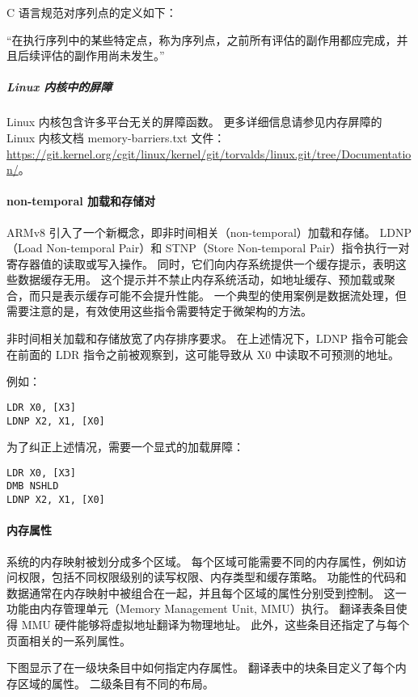 C 语言规范对序列点的定义如下：

“在执行序列中的某些特定点，称为序列点，之前所有评估的副作用都应完成，并且后续评估的副作用尚未发生。”

\subparagraph*{Linux 内核中的屏障}

Linux 内核包含许多平台无关的屏障函数。
更多详细信息请参见内存屏障的 Linux 内核文档 memory-barriers.txt 文件：
\url{https://git.kernel.org/cgit/linux/kernel/git/torvalds/linux.git/tree/Documentation/}。

\paragraph{non-temporal 加载和存储对}

ARMv8 引入了一个新概念，即非时间相关（non-temporal）加载和存储。
LDNP（Load Non-temporal Pair）和 STNP（Store Non-temporal Pair）指令执行一对寄存器值的读取或写入操作。
同时，它们向内存系统提供一个缓存提示，表明这些数据缓存无用。
这个提示并不禁止内存系统活动，如地址缓存、预加载或聚合，而只是表示缓存可能不会提升性能。
一个典型的使用案例是数据流处理，但需要注意的是，有效使用这些指令需要特定于微架构的方法。

非时间相关加载和存储放宽了内存排序要求。
在上述情况下，LDNP 指令可能会在前面的 LDR 指令之前被观察到，这可能导致从 X0 中读取不可预测的地址。

例如：

\begin{lstlisting}
LDR X0, [X3]
LDNP X2, X1, [X0]
\end{lstlisting}

为了纠正上述情况，需要一个显式的加载屏障：

\begin{lstlisting}
LDR X0, [X3]
DMB NSHLD
LDNP X2, X1, [X0]
\end{lstlisting}

\paragraph{内存属性}

系统的内存映射被划分成多个区域。
每个区域可能需要不同的内存属性，例如访问权限，包括不同权限级别的读写权限、内存类型和缓存策略。
功能性的代码和数据通常在内存映射中被组合在一起，并且每个区域的属性分别受到控制。
这一功能由内存管理单元（Memory Management Unit, MMU）执行。
翻译表条目使得 MMU 硬件能够将虚拟地址翻译为物理地址。
此外，这些条目还指定了与每个页面相关的一系列属性。

下图显示了在一级块条目中如何指定内存属性。
翻译表中的块条目定义了每个内存区域的属性。
二级条目有不同的布局。

